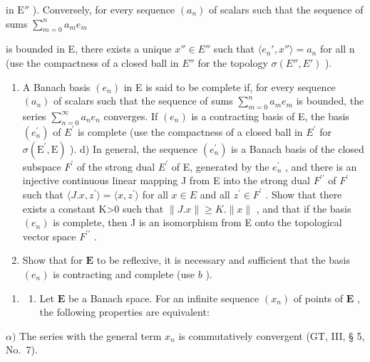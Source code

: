 in \(\mathrm{E}''\) ). Conversely, for every sequence \((a_{n})\) of scalars such that the sequence of sums \(\sum_{m=0}^{n} a_{m} e_{m}\)

is bounded in E, there exists a unique \(x'' \in E''\) such that \(\langle e_{n}', x'' \rangle = a_{n}\) for all n (use the compactness of a closed ball in \(E''\) for the topology \(\sigma(E'', E')\) ).

\begin{enumerate}
\def\labelenumi{\alph{enumi})}
\setcounter{enumi}{2}
\item
  A Banach basis \((e_n)\) in E is said to be complete if, for every sequence \((a_n)\) of scalars such that the sequence of sums \(\sum_{m=0}^{n} a_m e_m\) is bounded, the series \(\sum_{n=0}^{\infty} a_n e_n\) converges. If \((e_n)\) is a contracting basis of E, the basis \((e_{n}^{\prime})\) of \(E^{\prime}\) is complete (use the compactness of a closed ball in \(E^{\prime}\) for \(\sigma(\mathrm{E}^{\prime},\mathrm{E})\) ). d) In general, the sequence \((e_{n}^{\prime})\) is a Banach basis of the closed subspace \(F^{\prime}\) of the strong dual \(E^{\prime}\) of E, generated by the \(e_{n}^{\prime}\) , and there is an injective continuous linear mapping J from E into the strong dual \(F^{\prime\prime}\) of \(F^{\prime}\) such that \(\langle J.x,z^{\prime}\rangle=\langle x,z^{\prime}\rangle\) for all \(x\in E\) and all \(z^{\prime}\in F^{\prime}\) . Show that there exists a constant K\textgreater0 such that \(\|J.x\|\geqslant K.\|x\|\) , and that if the basis \((e_{n})\) is complete, then J is an isomorphism from E onto the topological vector space \(F^{\prime\prime}\) .
\item
  Show that for \(\mathbf{E}\) to be reflexive, it is necessary and sufficient that the basis \((e_n)\) is contracting and complete (use \(b\) ).
\end{enumerate}

\begin{enumerate}
\def\labelenumi{\arabic{enumi})}
\setcounter{enumi}{15}
\tightlist
\item
  \begin{enumerate}
  \def\labelenumii{\alph{enumii})}
  \tightlist
  \item
    Let \(\mathbf{E}\) be a Banach space. For an infinite sequence \((x_{n})\) of points of \(\mathbf{E}\) , the following properties are equivalent:
  \end{enumerate}
\end{enumerate}

\(\alpha)\) The series with the general term \(x_{n}\) is commutatively convergent (GT, III, § 5, No.~7).

